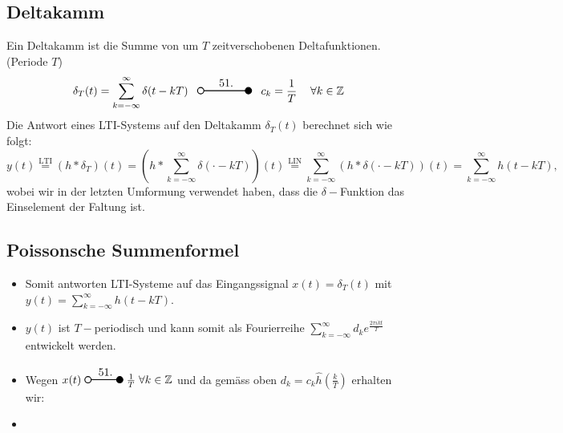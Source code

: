 \documentclass[11pt]{article}
\newcommand{\transform}[2]{%
    \begin{tikzpicture}
        \draw[thick] (0,0) circle (0.1);
        \draw[thick] (0.1,0) -- (#2,0) node[midway, above] {#1};
        \filldraw[thick] (#2,0) circle (0.1);
    \end{tikzpicture}%
}
\begin{document}
{\vspace*{-0.5cm}
\subsection*{Deltakamm}
\vspace*{-0.5cm}
Ein Deltakamm ist die Summe von um $T$ zeitverschobenen Deltafunktionen. (Periode $T$)
$$\delta_T(t) = \sum_{k = -\infty}^{\infty} \delta(t-kT) \hspace{8pt} \transform{51.}{1.5} \hspace{8pt} c_k = \frac{1}{T} \hspace{12pt} \forall k \in \mathbb{Z}$$
Die Antwort eines LTI-Systems auf den Deltakamm $\delta_T(t)$ berechnet sich wie folgt:
$$y(t) \overset{\text{LTI}}{=} (h \ast \delta_T)(t) = \left(h \ast \sum_{k = -\infty}^\infty \delta(\cdot - kT) \right)(t) \overset{\text{LIN}}{=} \sum_{k = -\infty}^\infty \left(h \ast \delta(\cdot - kT)\right)(t) = \sum_{k = -\infty}^\infty h(t-kT),$$
wobei wir in der letzten Umformung verwendet haben, dass die $\delta-$Funktion das Einselement der Faltung ist.

\vspace*{-0.5cm}
\subsection*{Poissonsche Summenformel}
\vspace*{-0.5cm}
\begin{itemize}[leftmargin=0pt]
    \item[] Somit antworten LTI-Systeme auf das Eingangssignal $x(t) = \delta_T(t)$ mit $y(t) = \displaystyle\sum_{k = -\infty}^\infty h(t-kT)$.
    \item[] $y(t)$ ist $T-$periodisch und kann somit als Fourierreihe $\displaystyle\sum_{k = -\infty}^\infty d_k e^{\frac{2 \pi i k t}{T}}$ entwickelt werden.
    \item[] Wegen $x(t) \; \transform{51.}{1} \; \frac{1}{T} \; \forall k \in \mathbb{Z}$  und da gemäss oben $d_k = c_k \hat{h}\left(\frac{k}{T}\right)$ erhalten wir:
    \item[] %
\end{itemize}



}
\end{document}
